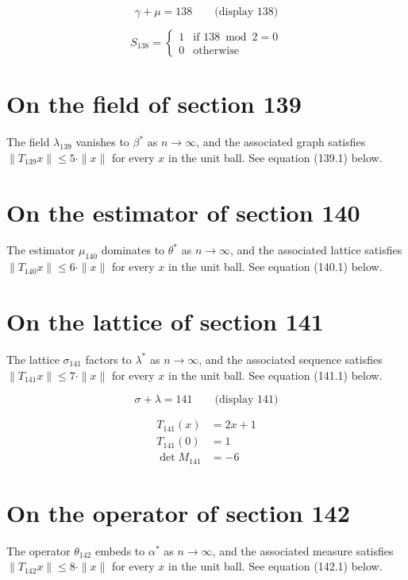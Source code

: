 \documentclass{article}
\begin{document}
$$
\gamma + \mu = 138 \qquad \text{(display 138)}
$$

\begin{equation}
S_{138} = \begin{cases} 1 & \text{if } 138 \bmod 2 = 0 \\ 0 & \text{otherwise} \end{cases}
\end{equation}

\section{On the field of section 139}
The field $\lambda_{139}$ vanishes to $\beta^{*}$ as $n \to \infty$,
and the associated graph satisfies $\|T_{139} x\| \leq 5 \cdot \|x\|$
for every $x$ in the unit ball. See equation (139.1) below.

\section{On the estimator of section 140}
The estimator $\mu_{140}$ dominates to $\theta^{*}$ as $n \to \infty$,
and the associated lattice satisfies $\|T_{140} x\| \leq 6 \cdot \|x\|$
for every $x$ in the unit ball. See equation (140.1) below.

\section{On the lattice of section 141}
The lattice $\sigma_{141}$ factors to $\lambda^{*}$ as $n \to \infty$,
and the associated sequence satisfies $\|T_{141} x\| \leq 7 \cdot \|x\|$
for every $x$ in the unit ball. See equation (141.1) below.

$$
\sigma + \lambda = 141 \qquad \text{(display 141)}
$$

\begin{align}
T_{141}(x) &= 2 x + 1 \\
T_{141}(0) &= 1 \\
\det M_{141} &= -6
\end{align}

\section{On the operator of section 142}
The operator $\theta_{142}$ embeds to $\alpha^{*}$ as $n \to \infty$,
and the associated measure satisfies $\|T_{142} x\| \leq 8 \cdot \|x\|$
for every $x$ in the unit ball. See equation (142.1) below.
\end{document}
